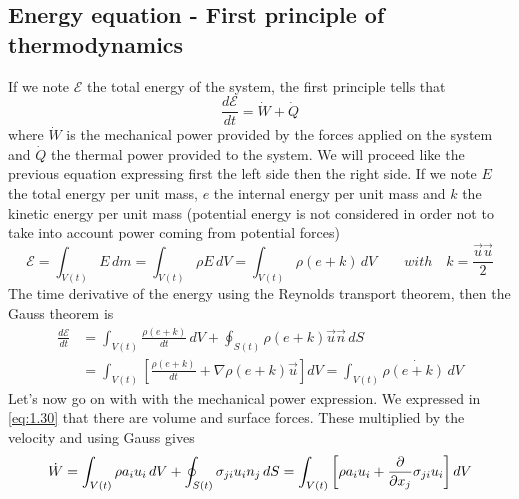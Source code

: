	\subsection{Energy equation - First principle of thermodynamics}
		If we note $\mathcal{E}$ the total energy of the system, the first principle tells that
		\begin{equation}
			\frac{d\mathcal{E}}{dt} = \dot{W} + \dot{Q}
			\label{eq:1.38}
		\end{equation}
		where $\dot{W}$ is the mechanical power provided by the forces applied on the system and $\dot{Q}$ the thermal power provided to the system. We will proceed like the previous equation expressing first the left side then the right side. If we note $E$ the total energy per unit mass, $e$ the internal energy per unit mass and $k$ the kinetic energy per unit mass (potential energy is not considered in order not to take into account power coming from potential forces)
		\begin{equation}
			\mathcal{E} = \int _{V(t)} E\, dm = \int _{V(t)} \rho E \, dV = \int _{V(t)} \rho (e+k) \, dV \qquad with \quad k = \frac{\vec{u} \vec{u}}{2}
		\end{equation}
		The time derivative of the energy using the Reynolds transport theorem, then the Gauss theorem is 
		\begin{equation}
		\begin{aligned}
			\frac{d\mathcal{E}}{dt} &= \int _{V(t)} \frac{\rho (e+k)}{dt} \, dV + \oint _{S(t)} \rho (e+k)\vec{u} \vec{n} \, dS \\
			&= \int _{V(t)} \left[\frac{\rho (e+k)}{dt} + \nabla \rho (e+k)\vec{u}  \right] dV = \int _{V(t)} \rho \dot{(e+k)}\, dV 
		\end{aligned}
		\label{eq:1.40}
		\end{equation}
		Let's now go on with with the mechanical power expression. We expressed in \eqref{eq:1.30} that there are volume and surface forces. These multiplied by the velocity and using Gauss gives 
		\begin{equation}
			\dot{W} = \int _{V(t)} \rho a_i u_i \, dV + \oint _{S(t)} \sigma _{ji} u_i n_j \, dS = \int _{V(t)} \left[ \rho a_i u_i + \frac{\D}{\D x_j}\sigma _{ji} u_i\right] dV
			\label{eq:1.41}
		\end{equation}
